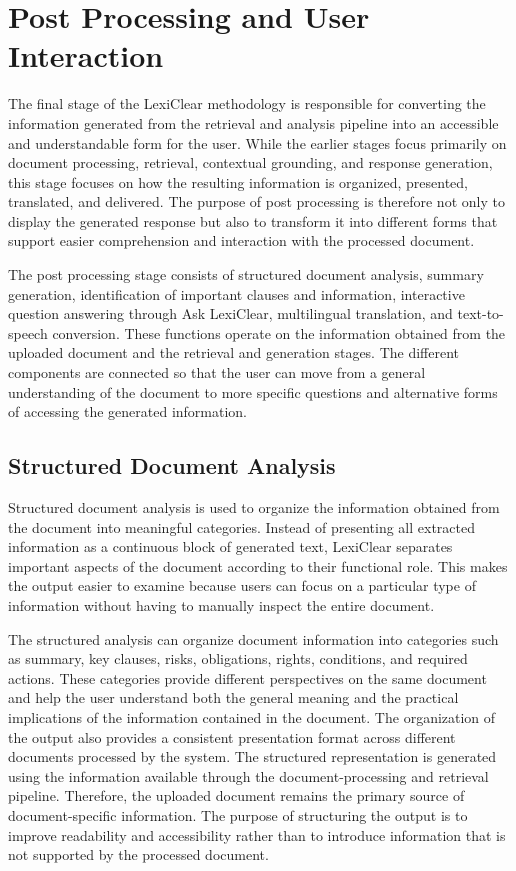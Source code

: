 \documentclass[12pt,a4paper,oneside]{report}
\begin{document}
\section{Post Processing and User Interaction}

The final stage of the LexiClear methodology is responsible for converting the information generated from the retrieval and analysis pipeline into an accessible and understandable form for the user. While the earlier stages focus primarily on document processing, retrieval, contextual grounding, and response generation, this stage focuses on how the resulting information is organized, presented, translated, and delivered. The purpose of post processing is therefore not only to display the generated response but also to transform it into different forms that support easier comprehension and interaction with the processed document.

The post processing stage consists of structured document analysis, summary generation, identification of important clauses and information, interactive question answering through Ask LexiClear, multilingual translation, and text-to-speech conversion. These functions operate on the information obtained from the uploaded document and the retrieval and generation stages. The different components are connected so that the user can move from a general understanding of the document to more specific questions and alternative forms of accessing the generated information.

\subsection{Structured Document Analysis}

Structured document analysis is used to organize the information obtained from the document into meaningful categories. Instead of presenting all extracted information as a continuous block of generated text, LexiClear separates important aspects of the document according to their functional role. This makes the output easier to examine because users can focus on a particular type of information without having to manually inspect the entire document.

The structured analysis can organize document information into categories such as summary, key clauses, risks, obligations, rights, conditions, and required actions. These categories provide different perspectives on the same document and help the user understand both the general meaning and the practical implications of the information contained in the document. The organization of the output also provides a consistent presentation format across different documents processed by the system. The structured representation is generated using the information available through the document-processing and retrieval pipeline. Therefore, the uploaded document remains the primary source of document-specific information. The purpose of structuring the output is to improve readability and accessibility rather than to introduce information that is not supported by the processed document.
\end{document}
